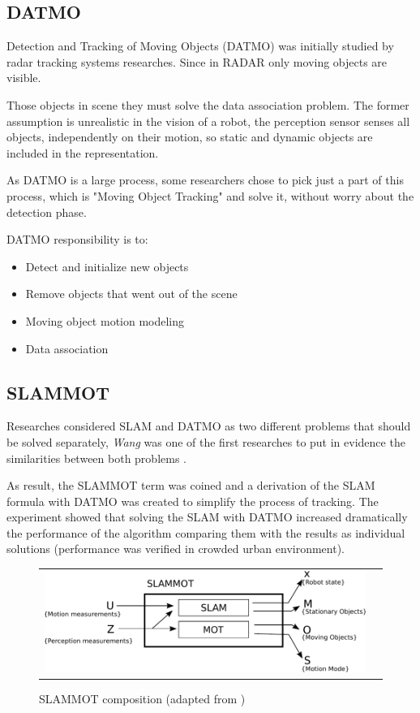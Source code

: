 \subsection{DATMO}

Detection and Tracking of Moving Objects (DATMO) was initially studied by radar tracking systems \cite{VU-2009-454238} researches. Since in RADAR only moving objects are visible.

Those objects in scene they must solve the data association problem. The former assumption is unrealistic in the vision of a robot, the perception sensor senses all objects, independently on their motion, so static and dynamic objects are included in the representation.

As DATMO is a large process, some researchers chose to pick just a part of this process, which is "Moving Object Tracking" and solve it, without worry about the detection phase.

DATMO responsibility is to:

\begin{itemize}
\item Detect and initialize new objects
\item Remove objects that went out of the scene
\item Moving object motion modeling
\item Data association
\end{itemize}

\subsection{SLAMMOT}

Researches considered SLAM and DATMO as two different problems that should be solved separately, \textit{Wang} was one of the first researches to put in evidence the similarities between both problems \cite{Wang03onlinesimultaneous}.

As result, the SLAMMOT term was coined and a derivation of the SLAM formula with DATMO was created to simplify the process of tracking. The experiment showed that solving the SLAM with DATMO increased dramatically the performance of the algorithm comparing them with the results as individual solutions (performance was verified in crowded urban environment).

\begin{figure}[h]
   \centering
     \begin{tabular}{lr}
       \includegraphics[scale=0.9]{img/fig:slammot}
     \end{tabular}
   \caption{SLAMMOT composition (adapted from \cite{Wang04a})}
   \label{fig:slammot}
 \end{figure}

